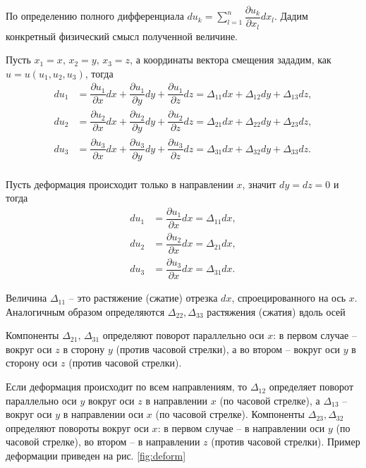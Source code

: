 \documentclass[12pt,a4paper]{article}
\begin{document}
    По определению полного дифференциала $du_k = \displaystyle \sum_{l = 1}^{n} \dfrac{\partial u_k}{\partial x_l} dx_l$. Дадим конкретный физический смысл полученной величине.  

    Пусть $ x_1 = x,\, x_2 = y,\, x_3 = z $, а координаты вектора смещения зададим, как $ u = u(u_1, u_2, u_3)$, тогда 
    \[
      \begin{split}
        du_1 &= \dfrac{\partial u_1}{\partial x}dx + \dfrac{\partial u_1}{\partial y}dy + \dfrac{\partial u_1}{\partial z}dz = \Delta_{11}dx + \Delta_{12}dy + \Delta_{13}dz,  \\[0.7em]
        du_2 &= \dfrac{\partial u_2}{\partial x}dx + \dfrac{\partial u_2}{\partial y}dy + \dfrac{\partial u_2}{\partial z}dz = \Delta_{21}dx + \Delta_{22}dy + \Delta_{23}dz, \\[0.7em]
        du_3 &= \dfrac{\partial u_3}{\partial x}dx + \dfrac{\partial u_3}{\partial y}dy + \dfrac{\partial u_3}{\partial z}dz = \Delta_{31}dx + \Delta_{32}dy + \Delta_{33}dz. \\
      \end{split}
    \]

    Пусть деформация происходит только в направлении $x$, значит $dy = dz = 0$ и тогда 
    \[
      \begin{split}
        du_1 &= \dfrac{\partial u_1}{\partial x}dx = \Delta_{11}dx, \\[0.7em]
        du_2 &= \dfrac{\partial u_2}{\partial x}dx = \Delta_{21}dx, \\[0.7em]
        du_3 &= \dfrac{\partial u_3}{\partial x}dx = \Delta_{31}dx.
      \end{split}
    \]
    
    Величина $ \Delta_{11} $ -- это растяжение (сжатие) отрезка $dx$, спроецированного на ось $x$. Аналогичным образом определяются $\Delta_{22}, \Delta_{33}$ растяжения (сжатия) вдоль осей 

    Компоненты $\Delta_{21},\, \Delta_{31}$ определяют поворот параллельно оси $x$: в первом случае -- вокруг оси $z$ в сторону $y$ (против часовой стрелки), а во втором -- вокруг оси $y$ в сторону оси $z$ (против часовой стрелки). 
    
    Если деформация происходит по всем направлениям, то $\Delta_{12}$ определяет поворот параллельно оси $y$ вокруг оси $z$ в направлении $x$ (по часовой стрелке), а $ \Delta_{13} $ -- вокруг оси $y$ в направлении оси $x$ (по часовой стрелке). Компоненты $\Delta_{23}, \Delta_{32}$ определяют повороты вокруг оси $x$: в первом случае -- в направлении оси $y$ (по часовой стрелке), во втором -- в направлении $z$ (против часовой стрелки). Пример деформации приведен на рис. \ref{fig:deform}
\end{document}
